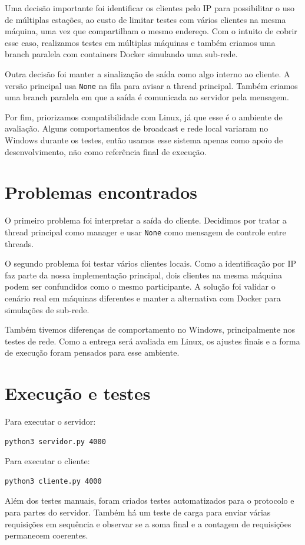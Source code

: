 \documentclass[12pt,a4paper]{article}
\begin{document}
Uma decisão importante foi identificar os clientes pelo IP para possibilitar o uso de múltiplas estações, ao custo de limitar testes com vários clientes na mesma máquina, uma vez que compartilham o mesmo endereço. Com o intuito de cobrir esse caso, realizamos testes em múltiplas máquinas e também criamos uma branch paralela com containers Docker simulando uma sub-rede.

Outra decisão foi manter a sinalização de saída como algo interno ao cliente. A
versão principal usa \texttt{None} na fila para avisar a thread principal. Também
criamos uma branch paralela em que a saída é comunicada ao servidor pela mensagem.

Por fim, priorizamos compatibilidade com Linux, já que esse é o ambiente de
avaliação. Alguns comportamentos de broadcast e rede local variaram no Windows
durante os testes, então usamos esse sistema apenas como apoio de desenvolvimento,
não como referência final de execução.

\section*{Problemas encontrados}

O primeiro problema foi interpretar a saída do cliente. Decidimos por tratar a thread principal como manager e usar \texttt{None} como mensagem de controle entre threads.

O segundo problema foi testar vários clientes locais. Como a identificação por IP
faz parte da nossa implementação principal, dois clientes na mesma máquina podem
ser confundidos como o mesmo participante. A solução foi validar o cenário real em
máquinas diferentes e manter a alternativa com Docker para simulações de sub-rede. 

Também tivemos diferenças de comportamento no Windows, principalmente nos testes
de rede. Como a entrega será avaliada em Linux, os ajustes finais e a forma de
execução foram pensados para esse ambiente.

\section*{Execução e testes}

Para executar o servidor:

\begin{verbatim}
python3 servidor.py 4000
\end{verbatim}

Para executar o cliente:

\begin{verbatim}
python3 cliente.py 4000
\end{verbatim}

Além dos testes manuais, foram criados testes automatizados para o protocolo e para
partes do servidor. Também há um teste de carga para enviar várias requisições em
sequência e observar se a soma final e a contagem de requisições permanecem
coerentes.
\end{document}
